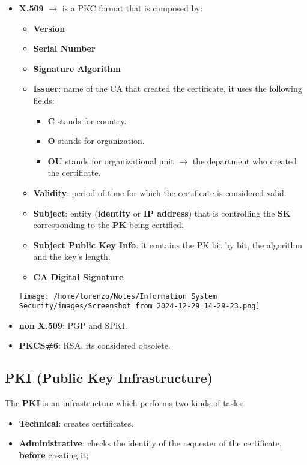 \begin{itemize}
    \item \textbf{X.509} \(\rightarrow \) is a PKC format that is composed by:
    \\
    \begin{minipage}{0.6\textwidth}
    	\vspace{0.4cm}
    \begin{itemize}
        \item \textbf{Version}
        \item \textbf{Serial Number}
        \item \textbf{Signature Algorithm}
        \item \textbf{Issuer}: name of the CA that created the certificate, it uses the following fields:
        \begin{itemize}
            \item \textbf{C} stands for country.
            \item \textbf{O} stands for organization.
            \item \textbf{OU} stands for organizational unit \(\rightarrow \) the department who created the certificate.
        \end{itemize}
        \item \textbf{Validity}: period of time for which the certificate is considered valid.
        \item \textbf{Subject}:  entity (\textbf{identity} or \textbf{IP address}) that is controlling the \textbf{SK} corresponding
        to the \textbf{PK} being certified.
        \item \textbf{Subject Public Key Info}: it contains the PK bit by bit, the algorithm and the
        key’s length.
        \item \textbf{CA Digital Signature}
    \end{itemize} 
    \end{minipage} 
    \hspace{0cm}
    \begin{minipage}{0.4\textwidth}
        \centering
        \texttt{[image: /home/lorenzo/Notes/Information System Security/images/Screenshot from 2024-12-29 14-29-23.png]}
    \end{minipage}
    \item \textbf{non X.509}: PGP and SPKI.
    \item \textbf{PKCS\#6}: RSA, its considered obsolete.
\end{itemize}

\subsection{PKI (Public Key Infrastructure)}
The \textbf{PKI} is an infrastructure which performs two kinds of tasks:
\begin{itemize}
    \item \textbf{Technical}: creates certificates.
    \item \textbf{Administrative}: checks the identity of the requester of the certificate, \textbf{before} creating it;
    
\end{itemize}
